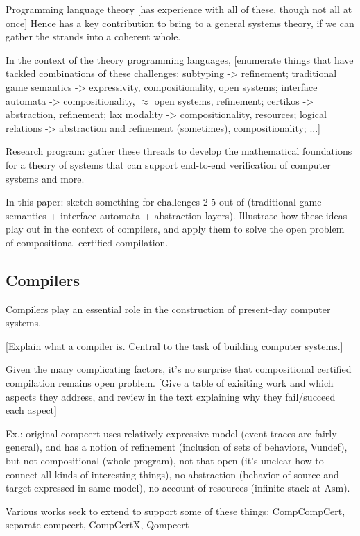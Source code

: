 \documentclass[sigplan,10pt,review,anonymous]{acmart}
\begin{document}
Programming language theory [has experience with all of these, though not all at once]
Hence has a key contribution to bring to a general systems theory,
if we can gather the strands into a coherent whole.

In the context of the theory programming languages,
[enumerate things that have tackled combinations of these
challenges:
subtyping -> refinement;
traditional game semantics -> expressivity, compositionality, open systems;
interface automata -> compositionality, $\approx$ open systems, refinement;
certikos -> abstraction, refinement;
lax modality -> compositionality, resources;
logical relations -> abstraction and refinement (sometimes), compositionality;
...]

Research program:
gather these threads to develop the mathematical foundations
for a theory of systems
that can support end-to-end verification of computer systems
and more.

In this paper:
sketch something for challenges 2-5
out of (traditional game semantics + interface automata + abstraction layers).
Illustrate how these ideas play out in the context of compilers,
and apply them to solve the open problem of
compositional certified compilation.

\subsection{Compilers} %

Compilers play an essential role in the construction
of present-day computer systems.

[Explain what a compiler is.
Central to the task of building computer systems.]

Given the many complicating factors,
it's no surprise that compositional certified compilation
remains open problem.
[Give a table of exisiting work and which aspects they address,
and review in the text explaining why they fail/succeed each aspect]

Ex.: original compcert uses relatively expressive model
(event traces are fairly general),
and has a notion of refinement (inclusion of sets of behaviors, Vundef),
but not compositional (whole program),
not that open (it's unclear how to connect all kinds of interesting things),
no abstraction (behavior of source and target expressed in same model),
no account of resources (infinite stack at Asm).

Various works seek to extend to support some of these things:
CompCompCert, separate compcert, CompCertX, Qompcert
\end{document}
